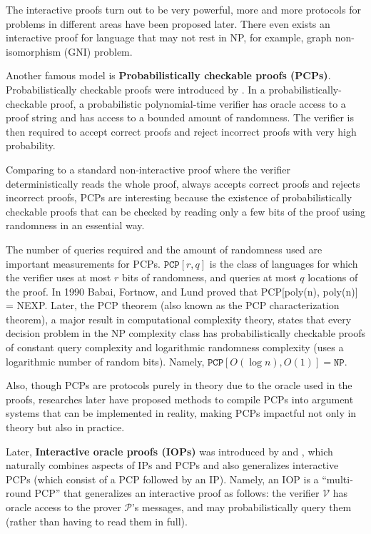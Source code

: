 The interactive proofs turn out to be very powerful, more and more protocols for problems in different areas have been proposed later. There even exists an interactive proof for language that may not rest in NP, for example, graph non-isomorphism (GNI) problem.

Another famous model is \textbf{Probabilistically checkable proofs (PCPs)}. Probabilistically checkable proofs were introduced by \cite{DBLP:journals/tcs/FortnowRS94} \cite{DBLP:conf/stoc/BabaiFLS91}. In a probabilistically-checkable proof, a probabilistic polynomial-time verifier has oracle access to a proof string and has access to a bounded amount of randomness. The verifier is then required to accept correct proofs and reject incorrect proofs with very high probability. 

Comparing to a standard non-interactive proof where the verifier  deterministically reads the whole proof, always accepts correct proofs and rejects incorrect proofs, 
PCPs are interesting because the existence of probabilistically checkable proofs that can be checked by reading only a few bits of the proof using randomness in an essential way.

The number of queries required and the amount of randomness used are important measurements for PCPs. $\texttt{PCP}[r, q]$ is the class of languages for which the verifier uses at most $r$ bits of randomness, and queries at most $q$ locations of the proof.
In 1990 Babai, Fortnow, and Lund \cite{DBLP:conf/focs/BabaiFL90} proved that PCP[poly(n), poly(n)] = NEXP. 
Later, the PCP theorem (also known as the PCP characterization theorem), 
a major result in computational complexity theory, 
states that every decision problem in the NP complexity class has probabilistically checkable proofs of constant query complexity 
and logarithmic randomness complexity (uses a logarithmic number of random bits).
Namely, $\texttt{PCP}[O(\log n), O(1)] = \texttt{NP}$.

Also, though PCPs are protocols purely in theory due to the oracle used in the proofs, researches later have proposed methods \cite{DBLP:conf/stoc/Kilian92} to compile PCPs into argument systems that can be implemented in reality, making PCPs impactful not only in theory but also in practice. 

Later, \textbf{Interactive oracle proofs (IOPs)} was introduced by \cite{DBLP:conf/tcc/Ben-SassonCS16} and \cite{DBLP:journals/jacm/KalaiRR22}, which naturally combines aspects of IPs and PCPs and also generalizes interactive PCPs 
(which consist of a PCP followed by an IP). 
Namely, an IOP is a ``multi-round PCP'' that generalizes an interactive proof as follows:
the verifier $\mathcal{V}$ has oracle access to the prover $\mathcal{P}$’s messages, and may probabilistically query them (rather than having to read them in full). 


